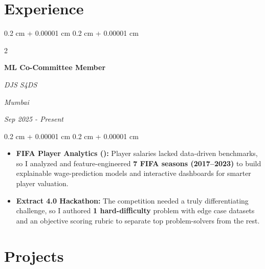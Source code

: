 \documentclass[10pt, letterpaper]{article}
\newenvironment{highlights}{
    \begin{itemize}[
        topsep=0.10 cm,
        parsep=0.10 cm,
        partopsep=0pt,
        itemsep=0pt,
        leftmargin=0.4 cm + 10pt
    ]
}{
    \end{itemize}
} %
\newenvironment{onecolentry}{
    \begin{adjustwidth}{
        0.2 cm + 0.00001 cm
    }{
        0.2 cm + 0.00001 cm
    }
}{
    \end{adjustwidth}
} %
\newenvironment{twocolentry}[2][]{
    \onecolentry
    \def\secondColumn{#2}
    \setcolumnwidth{\fill, 4.5 cm}
    \begin{paracol}{2}
}{
    \switchcolumn \raggedleft \secondColumn
    \end{paracol}
    \endonecolentry
} %
\let\hrefWithoutArrow\href
\renewcommand{\href}[2]{\hrefWithoutArrow{#1}{\ifthenelse{\equal{#2}{}}{ }{#2 }\raisebox{.15ex}{\footnotesize \faExternalLink*}}}
\begin{document}
    \section{Experience}
    
        \begin{twocolentry}{
        \textit{Mumbai}    
            
        \textit{Sep 2025 - Present}}
            \textbf{ML Co-Committee Member}
            
            \textit{DJS S4DS}
        \end{twocolentry}

        \vspace{0.10 cm}
        \begin{onecolentry}
            \begin{highlights}
                \item \textbf{FIFA Player Analytics (\href{https://github.com/N1KH1LT0X1N/Plotting}{GitHub}):} Player salaries lacked data-driven benchmarks, so I analyzed and feature-engineered \textbf{7 FIFA seasons (2017--2023)} to build explainable wage-prediction models and interactive dashboards for smarter player valuation.
                \item \textbf{Extract 4.0 Hackathon:} The competition needed a truly differentiating challenge, so I authored \textbf{1 hard-difficulty} problem with edge case datasets and an objective scoring rubric to separate top problem-solvers from the rest.
            \end{highlights}
        \end{onecolentry}


    

    
    \section{Projects}     
                 
\end{document}
